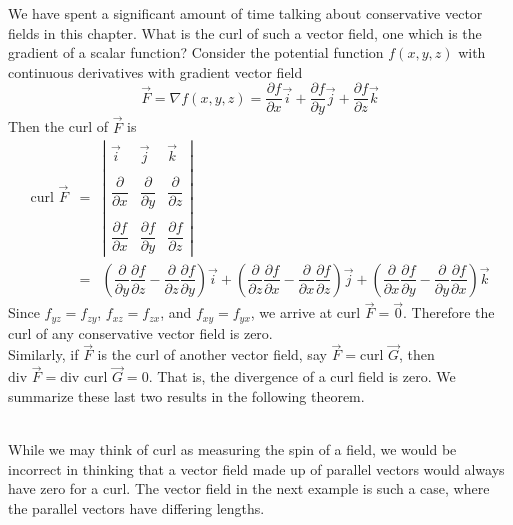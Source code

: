 We have spent a significant amount of time talking about conservative vector fields in this chapter.  What is the curl of such a vector field, one which is the gradient of a scalar function?  Consider the potential function $f(x,y,z)$ with continuous derivatives with gradient vector field $$\vec F = \nabla f(x,y,z) = \dfrac{\partial f}{\partial x} \vec i + \dfrac{\partial f}{\partial y} \vec j + \dfrac{\partial f}{\partial z} \vec k$$
Then the curl of $\vec F$ is
\begin{eqnarray*}
\text{curl } \vec F & = & \left| \begin{array}{ccc} \vec i & \vec j & \vec k \\ & & \\ \dfrac{\partial}{\partial x} & \dfrac{\partial}{\partial y} & \dfrac{\partial}{\partial z} \\ &  & \\ \dfrac{\partial f}{\partial x} & \dfrac{\partial f}{\partial y} & \dfrac{\partial f}{\partial z} \end{array} \right| \\
& = & \left( \dfrac{\partial}{\partial y} \dfrac{\partial f}{\partial z} - \dfrac{\partial}{\partial z} \dfrac{\partial f}{\partial y} \right) \vec i + \left( \dfrac{\partial}{\partial z} \dfrac{\partial f}{\partial x} - \dfrac{\partial}{\partial x} \dfrac{\partial f}{\partial z} \right)  \vec j + \left( \dfrac{\partial}{\partial x} \dfrac{\partial f}{\partial y} - \dfrac{\partial}{\partial y} \dfrac{\partial f}{\partial x} \right) \vec k
\end{eqnarray*}
Since $f_{yz} = f_{zy}$, $f_{xz} = f_{zx}$, and $f_{xy} = f_{yx}$, we arrive at $\text{curl } \vec F = \vec 0$.  Therefore the curl of any conservative vector field is zero.\\

Similarly, if $\vec F$ is the curl of another vector field, say $\vec F = \text{curl } \vec G$, then $\text{div } \vec F = \text{div } \text{curl } \vec G = 0$.  That is, the divergence of a curl field is zero.  We summarize these last two results in the following theorem.

\\

While we may think of curl as measuring the spin of a field, we would be incorrect in thinking that a vector field made up of parallel vectors would always have zero for a curl.  The vector field in the next example is such a case, where the parallel vectors have differing lengths.\\

